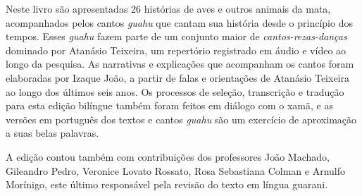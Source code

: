 Neste livro são apresentadas 26 histórias de aves e outros animais da
mata, acompanhados pelos cantos \textit{guahu} que cantam sua história
desde o princípio dos tempos. Esses \textit{guahu} fazem parte de um
conjunto maior de \textit{cantos-rezas-danças} dominado por Atanásio Teixeira, um
repertório registrado em áudio e vídeo ao longo da pesquisa. As
narrativas e explicações que acompanham os cantos foram elaboradas por
Izaque João, a partir de falas e orientações de Atanásio Teixeira ao
longo dos últimos seis anos. Os processos de seleção, transcrição e
tradução para esta edição bilíngue também foram feitos em diálogo com o
xamã, e as versões em português dos textos e cantos \textit{guahu} são um
exercício de aproximação a suas belas palavras.

A edição contou também com contribuições dos professores João Machado,
Gileandro Pedro, Veronice Lovato Rossato, Rosa Sebastiana Colman e
Arnulfo Morínigo, este último responsável pela revisão do texto em
língua guarani.
